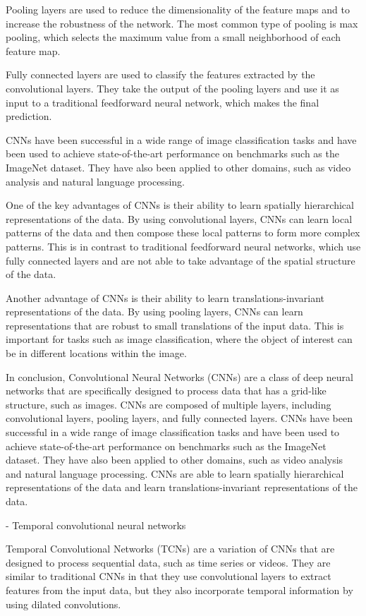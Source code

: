 Pooling layers are used to reduce the dimensionality of the feature maps and to increase the robustness of the network. The most common type of pooling is max pooling, which selects the maximum value from a small neighborhood of each feature map.

Fully connected layers are used to classify the features extracted by the convolutional layers. They take the output of the pooling layers and use it as input to a traditional feedforward neural network, which makes the final prediction.

CNNs have been successful in a wide range of image classification tasks and have been used to achieve state-of-the-art performance on benchmarks such as the ImageNet dataset. They have also been applied to other domains, such as video analysis and natural language processing.

One of the key advantages of CNNs is their ability to learn spatially hierarchical representations of the data. By using convolutional layers, CNNs can learn local patterns of the data and then compose these local patterns to form more complex patterns. This is in contrast to traditional feedforward neural networks, which use fully connected layers and are not able to take advantage of the spatial structure of the data.

Another advantage of CNNs is their ability to learn translations-invariant representations of the data. By using pooling layers, CNNs can learn representations that are robust to small translations of the input data. This is important for tasks such as image classification, where the object of interest can be in different locations within the image.

In conclusion, Convolutional Neural Networks (CNNs) are a class of deep neural networks that are specifically designed to process data that has a grid-like structure, such as images. CNNs are composed of multiple layers, including convolutional layers, pooling layers, and fully connected layers. CNNs have been successful in a wide range of image classification tasks and have been used to achieve state-of-the-art performance on benchmarks such as the ImageNet dataset. They have also been applied to other domains, such as video analysis and natural language processing. CNNs are able to learn spatially hierarchical representations of the data and learn translations-invariant representations of the data.

- Temporal convolutional neural networks

Temporal Convolutional Networks (TCNs) are a variation of CNNs that are designed to process sequential data, such as time series or videos. They are similar to traditional CNNs in that they use convolutional layers to extract features from the input data, but they also incorporate temporal information by using dilated convolutions.

